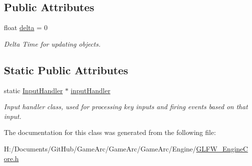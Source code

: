 \subsection*{Public Attributes}
\begin{DoxyCompactItemize}
\item 
\hypertarget{class_g_l_f_w___engine_core_aeffcd56c9c7f9037b3f2207385680f93}{float \hyperlink{class_g_l_f_w___engine_core_aeffcd56c9c7f9037b3f2207385680f93}{delta} = 0}\label{class_g_l_f_w___engine_core_aeffcd56c9c7f9037b3f2207385680f93}

\begin{DoxyCompactList}\small\item\em Delta Time for updating objects. \end{DoxyCompactList}\end{DoxyCompactItemize}
\subsection*{Static Public Attributes}
\begin{DoxyCompactItemize}
\item 
\hypertarget{class_g_l_f_w___engine_core_a051002d77b6722b81e40ec318c194cce}{static \hyperlink{class_input_handler}{Input\+Handler} $\ast$ \hyperlink{class_g_l_f_w___engine_core_a051002d77b6722b81e40ec318c194cce}{input\+Handler}}\label{class_g_l_f_w___engine_core_a051002d77b6722b81e40ec318c194cce}

\begin{DoxyCompactList}\small\item\em Input handler class, used for processing key inputs and firing events based on that input. \end{DoxyCompactList}\end{DoxyCompactItemize}


The documentation for this class was generated from the following file\+:\begin{DoxyCompactItemize}
\item 
H\+:/\+Documents/\+Git\+Hub/\+Game\+Arc/\+Game\+Arc/\+Game\+Arc/\+Engine/\hyperlink{_g_l_f_w___engine_core_8h}{G\+L\+F\+W\+\_\+\+Engine\+Core.\+h}\end{DoxyCompactItemize}
